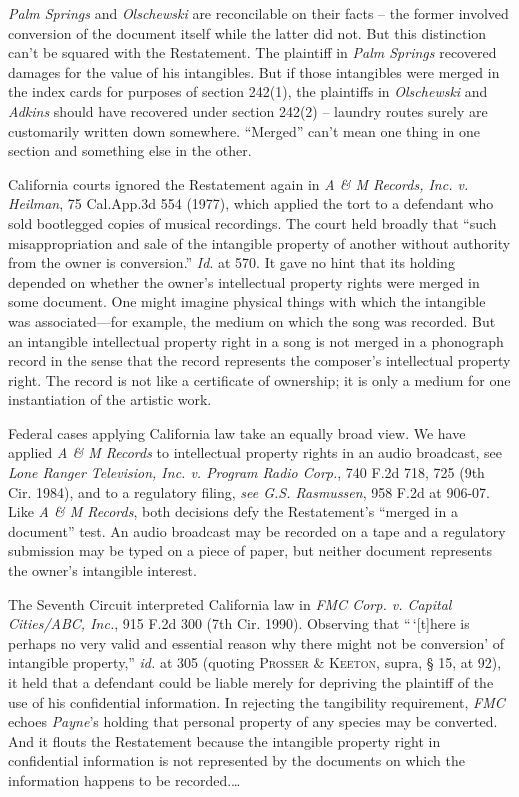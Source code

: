 \textit{Palm Springs} and \textit{Olschewski} are reconcilable on their facts --
the former involved conversion of the document itself while the latter did not.
But this distinction can't be squared with the Restatement. The plaintiff in
\textit{Palm Springs} recovered damages for the value of his intangibles. But
if those intangibles were merged in the index cards for purposes of section
242(1), the plaintiffs in \textit{Olschewski} and \textit{Adkins} should have
recovered under section 242(2) -- laundry routes surely are customarily written
down somewhere. ``Merged'' can't mean one thing in one section and something
else in the other.

California courts ignored the Restatement again in \textit{A \& M Records, Inc.
v. Heilman}, 75 Cal.App.3d 554 (1977), which applied the tort to a defendant
who sold bootlegged copies of musical recordings. The court held broadly that
``such misappropriation and sale of the intangible property of another without
authority from the owner is conversion.'' \textit{Id}. at 570. It gave no hint
that its holding depended on whether the owner's intellectual property rights
were merged in some document. One might imagine physical things with which the
intangible was associated---for example, the medium on which the song was
recorded. But an intangible intellectual property right in a song is not merged
in a phonograph record in the sense that the record represents the composer's
intellectual property right. The record is not like a certificate of ownership;
it is only a medium for one instantiation of the artistic work.

Federal cases applying California law take an equally broad view. We have
applied \textit{A \& M Records} to intellectual property rights in an audio
broadcast, see \textit{Lone Ranger Television, Inc. v. Program Radio Corp.},
740 F.2d 718, 725 (9th Cir. 1984), and to a regulatory filing, \textit{see G.S.
Rasmussen}, 958 F.2d at 906-07. Like \textit{A \& M Records}, both decisions
defy the Restatement's ``merged in a document'' test. An audio broadcast may be
recorded on a tape and a regulatory submission may be typed on a piece of
paper, but neither document represents the owner's intangible interest.

The Seventh Circuit interpreted California law in \textit{FMC Corp. v. Capital
Cities/ABC, Inc.}, 915 F.2d 300 (7th Cir. 1990). Observing that
``\,`[t]here is perhaps no very valid and essential reason why
there might not be conversion' of intangible property,'' \emph{id.} at 305
(quoting
\textsc{Prosser \& Keeton}, supra, {\S} 15, at 92), it held that a defendant
could be liable merely for depriving the plaintiff of the use of his
confidential information. In rejecting the tangibility requirement,
\textit{FMC} echoes \textit{Payne}'s holding that personal property of any
species may be converted. And it flouts the Restatement because the intangible
property right in confidential information is not represented by the documents
on which the information happens to be recorded.\ldots

